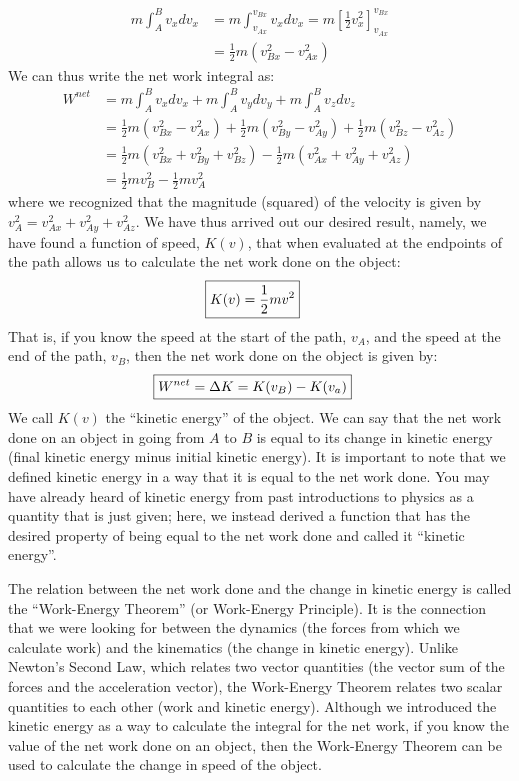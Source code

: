 \begin{align*}
m\int_A^B v_xdv_x &= m\int_{v_{Ax}}^{v_{Bx}} v_xdv_x= m\left[\frac{1}{2}v_x^2  \right]_{v_{Ax}}^{v_{Bx}}\\
&=\frac{1}{2}m(v_{Bx}^2-v_{Ax}^2)
\end{align*} 
We can thus write the net work integral as:
\begin{align*}
W^{net} &=m\int_A^B v_xdv_x +m\int_A^B  v_ydv_y + m\int_A^B v_zdv_z\\
&=\frac{1}{2}m(v_{Bx}^2-v_{Ax}^2) + \frac{1}{2}m(v_{By}^2-v_{Ay}^2) +\frac{1}{2}m(v_{Bz}^2-v_{Az}^2)\\
&=\frac{1}{2}m(v_{Bx}^2+v_{By}^2+v_{Bz}^2)-\frac{1}{2}m(v_{Ax}^2+v_{Ay}^2+v_{Az}^2)\\
&=\frac{1}{2}mv_B^2 - \frac{1}{2}mv_A^2
\end{align*}
where we recognized that the magnitude (squared) of the velocity is given by $v_A^2 = v_{Ax}^2+v_{Ay}^2+v_{Az}^2$. We have thus arrived out our desired result, namely, we have found a function of speed, $K(v)$, that when evaluated at the endpoints of the path allows us to calculate the net work done on the object:
\begin{align}
\Aboxed{K(v) = \frac{1}{2}mv^2}
\end{align}
That is, if you know the speed at the start of the path, $v_A$, and the speed at the end of the path, $v_B$, then the net work done on the object is given by:
\begin{align}
\Aboxed{W^{net} = \Delta K = K(v_B) - K(v_a)}
\end{align}
We call $K(v)$ the ``kinetic energy'' of the object. We can say that the net work done on an object in going from $A$ to $B$ is equal to its change in kinetic energy (final kinetic energy minus initial kinetic energy). It is important to note that we defined kinetic energy in a way that it is equal to the net work done. You may have already heard of kinetic energy from past introductions to physics as a quantity that is just given; here, we instead derived a function that has the desired property of being equal to the net work done and called it ``kinetic energy''. 

The relation between the net work done and the change in kinetic energy is called the ``Work-Energy Theorem'' (or Work-Energy Principle). It is the connection that we were looking for between the dynamics (the forces from which we calculate work) and the kinematics (the change in kinetic energy). Unlike Newton's Second Law, which relates two vector quantities (the vector sum of the forces and the acceleration vector), the Work-Energy Theorem relates two scalar quantities to each other (work and kinetic energy). Although we introduced the kinetic energy as a way to calculate the integral for the net work, if you know the value of the net work done on an object, then the Work-Energy Theorem can be used to calculate the change in speed of the object.

